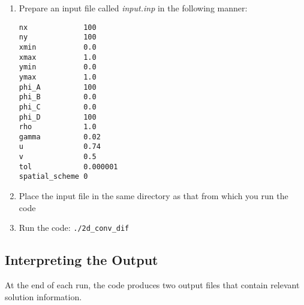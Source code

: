 \documentclass{article}
\begin{document}
\begin{enumerate}
    \item Prepare an input file called \textit{input.inp} in the following manner:
\begin{lstlisting}
nx             100
ny             100
xmin           0.0
xmax           1.0
ymin           0.0
ymax           1.0 
phi_A          100
phi_B          0.0 
phi_C          0.0
phi_D          100
rho            1.0
gamma          0.02
u              0.74
v              0.5
tol            0.000001
spatial_scheme 0
\end{lstlisting}
    \item Place the input file in the same directory as that from which you run the code
    \item Run the code: \texttt{./2d\_conv\_dif}
\end{enumerate}

\subsection{Interpreting the Output}
At the end of each run, the code produces two output files that contain relevant solution information.
\end{document}
